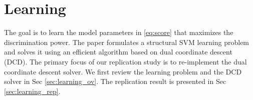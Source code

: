 \documentclass[10pt,twocolumn,letterpaper]{article}
\begin{document}



\section{Learning}
The goal is to learn the model parameters in \ref{eq:score} that maximizes the discrimination power. The paper formulates a structural SVM learning problem and solves it using an efficient algorithm based on dual coordinate descent (DCD). The primary focus of our replication study is to re-implement the dual coordinate descent solver. We first review the learning problem and the DCD solver in Sec \ref{sec:learning_ov}. The replication result is presented in Sec \ref{sec:learning_rep}. 
\end{document}
